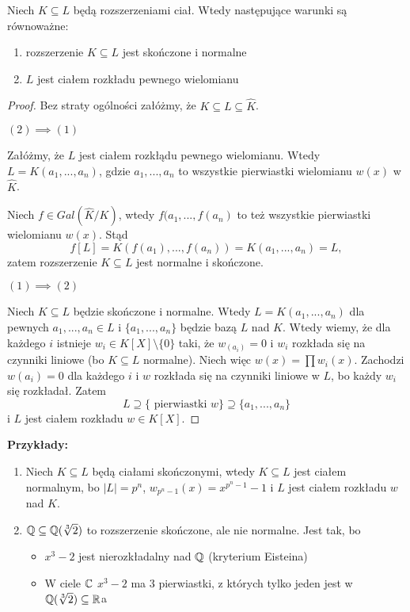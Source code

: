 \begin{theorem}
    Niech $K\subseteq L$ będą rozszerzeniami ciał. Wtedy następujące warunki są równoważne:
    \begin{enumerate}
        \item rozszerzenie $K\subseteq L$ jest skończone i normalne
        \item $L$ jest ciałem rozkładu pewnego wielomianu
    \end{enumerate}
\end{theorem}
\begin{proof} Bez straty ogólności załóżmy, że $K\subseteq L\subseteq\hat{K}$.

$(2)\implies(1)$

Załóżmy, że $L$ jest ciałem rozkłądu pewnego wielomianu. Wtedy $L=K(a_1,...,a_n)$, gdzie $a_1,...,a_n$ to wszystkie pierwiastki wielomianu $w(x)$ w $\hat{K}$.

Niech $f\in Gal(\hat{K}/K)$, wtedy $f(a_1,...,f(a_n)$ to też wszystkie pierwiastki wielomianu $w(x)$. Stąd 
$$f[L]=K(f(a_1),...,f(a_n))=K(a_1,...,a_n)=L,$$
zatem rozszerzenie $K\subseteq L$ jest normalne i skończone.

$(1)\implies(2)$

Niech $K\subseteq L$ będzie skończone i normalne. Wtedy $L=K(a_1,...,a_n)$ dla pewnych $a_1,...,a_n\in L$ i $\{a_1,...,a_n\}$ będzie bazą $L$ nad $K$. Wtedy wiemy, że dla każdego $i$ istnieje $w_i\in K[X]\setminus\{0\}$ taki, że $w_(a_i)=0$ i $w_i$ rozkłada się na czynniki liniowe (bo $K\subseteq L$ normalne). Niech więc $w(x)=\prod w_i(x)$. Zachodzi $w(a_i)=0$ dla każdego $i$ i $w$ rozkłada się na czynniki liniowe w $L$, bo każdy $w_i$ się rozkładał. Zatem 
$$L\supseteq\{\text{ pierwiastki }w\}\supseteq\{a_1,...,a_n\}$$
i $L$ jest ciałem rozkładu $w\in K[X]$. 

\end{proof}

\textbf{Przykłady:} 
\begin{enumerate}
    \item Niech $K\subseteq L$ będą ciałami skończonymi, wtedy $K\subseteq L$ jest ciałem normalnym, bo $|L|=p^n$, $w_{p^n-1}(x)=x^{p^n-1}-1$ i $L$ jest ciałem rozkładu $w$ nad $K$.
    \item $\mathbb{Q}\subseteq\mathbb{Q}(\sqrt[3]{2})$ to rozszerzenie skończone, ale nie normalne. Jest tak, bo
        \begin{itemize}
            \item $x^3-2$ jest nierozkładalny nad $\mathbb{Q}$ (kryterium Eisteina)
            \item W ciele $\mathbb{C}$ $x^3-2$ ma $3$ pierwiastki, z których tylko jeden jest w $\mathbb{Q}(\sqrt[3]{2})\subseteq\mathbb{R}$a
        \end{itemize}
\end{enumerate}


